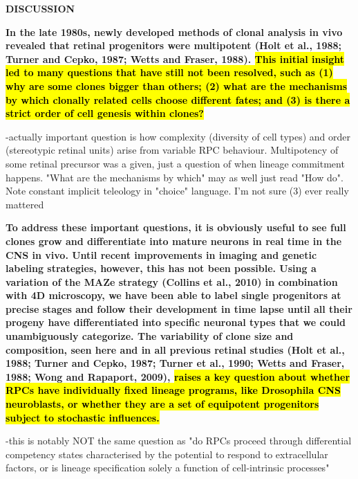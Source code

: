 \bigskip

\textbf{DISCUSSION}

\bigskip

\textbf{
In the late 1980s, newly developed methods of clonal analysis
in vivo revealed that retinal progenitors were multipotent (Holt
et al., 1988; Turner and Cepko, 1987; Wetts and Fraser, 1988).
\hl{This initial insight led to many questions that have still not been
resolved, such as (1) why are some clones bigger than others;
(2) what are the mechanisms by which clonally related cells
choose different fates; and (3) is there a strict order of cell
genesis within clones?}
}

\bigskip

-actually important question is how complexity (diversity of cell types) and order (stereotypic retinal units) arise from variable RPC behaviour. Multipotency of some retinal precursor was a given, just a question of when lineage commitment happens. "What are the mechanisms by which" may as well just read "How do". Note constant implicit teleology in "choice" language. I'm not sure (3) ever really mattered

\bigskip

\textbf{
To address these important questions,
it is obviously useful to see full clones grow and differentiate
into mature neurons in real time in the CNS in vivo. Until recent
improvements in imaging and genetic labeling strategies,
however, this has not been possible. Using a variation of the
MAZe strategy (Collins et al., 2010) in combination with 4D
microscopy, we have been able to label single progenitors at
precise stages and follow their development in time lapse until
all their progeny have differentiated into specific neuronal types
that we could unambiguously categorize.
The variability of clone size and composition, seen here and in
all previous retinal studies (Holt et al., 1988; Turner and Cepko,
1987; Turner et al., 1990; Wetts and Fraser, 1988; Wong and
Rapaport, 2009), \hl{raises a key question about whether RPCs
have individually fixed lineage programs, like Drosophila CNS
neuroblasts, or whether they are a set of equipotent progenitors
subject to stochastic influences.} }

\bigskip

-this is notably NOT the same question as "do RPCs proceed through differential competency states characterised by the potential to respond to extracellular factors, or is lineage specification solely a function of cell-intrinsic processes"

